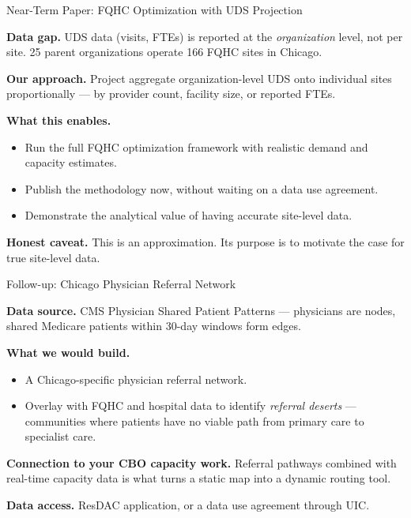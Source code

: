 \documentclass[aspectratio=169]{beamer}
\begin{document}
\begin{frame}{Near-Term Paper: FQHC Optimization with UDS Projection}

\textbf{Data gap.} UDS data (visits, FTEs) is reported at the
\emph{organization} level, not per site. 25 parent organizations operate 166
FQHC sites in Chicago.

\bigskip
\textbf{Our approach.} Project aggregate organization-level UDS onto individual
sites proportionally --- by provider count, facility size, or reported FTEs.

\bigskip
\textbf{What this enables.}
\begin{itemize}
  \item Run the full FQHC optimization framework with realistic demand and
        capacity estimates.
  \item Publish the methodology now, without waiting on a data use agreement.
  \item Demonstrate the analytical value of having accurate site-level data.
\end{itemize}

\bigskip
\textbf{Honest caveat.} This is an approximation. Its purpose is to motivate
the case for true site-level data.

\end{frame}

\begin{frame}{Follow-up: Chicago Physician Referral Network}

\textbf{Data source.} CMS Physician Shared Patient Patterns --- physicians are
nodes, shared Medicare patients within 30-day windows form edges.

\bigskip
\textbf{What we would build.}
\begin{itemize}
  \item A Chicago-specific physician referral network.
  \item Overlay with FQHC and hospital data to identify \emph{referral deserts}
        --- communities where patients have no viable path from primary care to
        specialist care.
\end{itemize}

\bigskip
\textbf{Connection to your CBO capacity work.} Referral pathways combined with
real-time capacity data is what turns a static map into a dynamic routing tool.

\bigskip
\textbf{Data access.} ResDAC application, or a data use agreement through UIC.

\end{frame}
\end{document}
